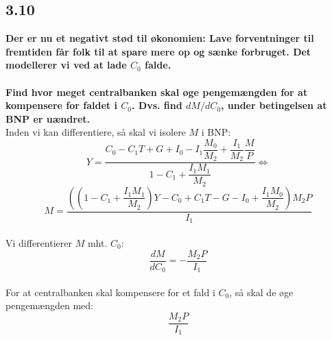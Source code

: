 \documentclass[a4paper, 12pt]{article}
\begin{document}
\subsection*{3.10}
\textbf{Der er nu et negativt stød til økonomien: Lave forventninger til fremtiden får folk til at spare mere op og sænke forbruget. Det modellerer vi ved at lade $C_{0}$ falde.}
\\\\
\textbf{Find hvor meget centralbanken skal øge pengemængden for at kompensere for faldet i $C_{0}$. Dvs. find $dM/dC_{0}$, under betingelsen at BNP er uændret.}
\\
Inden vi kan differentiere, så skal vi isolere $M$ i BNP:
$$Y = \dfrac{C_{0} - C_{1}T + G + I_{0} - I_{1}\dfrac{M_{0}}{M_{2}} + \dfrac{I_{1}}{M_{2}}\dfrac{M}{P}}{1 - C_{1} + \dfrac{I_{1}M_{1}}{M_{2}}} \Leftrightarrow$$
$$M = \dfrac{\left( \left( 1 - C_{1} + \dfrac{I_{1}M_{1}}{M_{2}} \right) Y - C_{0} + C_{1}T - G - I_{0} + \dfrac{I_{1}M_{0}}{M_{2}}  \right)M_{2}P }{I_{1}}$$
\\
Vi differentierer $M$ mht. $C_{0}$:
$$\dfrac{dM}{dC_{0}} = -  \dfrac{M_{2}P}{I_{1}}$$
\\
For at centralbanken skal kompensere for et fald i $C_{0}$, så skal de øge pengemængden med: 
$$\dfrac{M_{2}P}{I_{1}}$$

\end{document}
